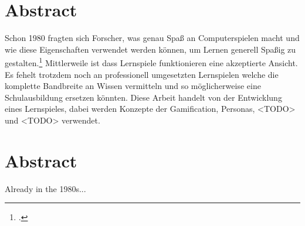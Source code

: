 \section*{Abstract}
Schon 1980 fragten sich Forscher, was genau Spaß an Computerspielen macht und wie diese Eigenschaften verwendet werden können, um Lernen generell Spaßig zu gestalten.\footcite{learn-game-history} Mittlerweile ist dass Lernspiele funktionieren eine akzeptierte Ansicht. Es fehelt trotzdem noch an professionell umgesetzten Lernspielen welche die komplette Bandbreite an Wissen vermitteln und so möglicherweise eine Schulausbildung ersetzen könnten.
Diese Arbeit handelt von der Entwicklung eines Lernspieles, dabei werden Konzepte der Gamification, Personas, <TODO> und <TODO> verwendet.

\vfill

\section*{Abstract}
Already in the 1980s...

\vfill\newpage
